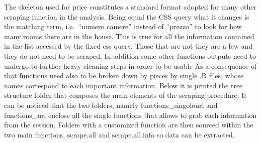 \documentclass[
  12pt,
  a4paper,
  oneside]{book}
\newenvironment{Shaded}{\begin{snugshade}}{\end{snugshade}}
\newcommand{\DataTypeTok}[1]{\textcolor[rgb]{0.13,0.29,0.53}{#1}}
\newcommand{\ErrorTok}[1]{\textcolor[rgb]{0.64,0.00,0.00}{\textbf{#1}}}
\newcommand{\KeywordTok}[1]{\textcolor[rgb]{0.13,0.29,0.53}{\textbf{#1}}}
\newcommand{\NormalTok}[1]{#1}
\newcommand{\StringTok}[1]{\textcolor[rgb]{0.31,0.60,0.02}{#1}}
\theoremstyle{definition}
\theoremstyle{definition}
\theoremstyle{definition}
\theoremstyle{remark}
\begin{document}
\begin{Shaded}
\begin{Highlighting}[]
{\NormalTok{                  ...}
                  
\NormalTok{                   combine =}\StringTok{ }\KeywordTok{tibble}\NormalTok{(}\DataTypeTok{ID        =}\NormalTok{ id,}
                                     \DataTypeTok{LAT       =}\NormalTok{ lat, }
                                     \DataTypeTok{LONG      =}\NormalTok{ long,}
                                     \DataTypeTok{LOCATION  =}\NormalTok{ location,}
                                     \DataTypeTok{CONDOM    =}\NormalTok{ condom,}
                                     \DataTypeTok{BUILDAGE  =}\NormalTok{ buildage,}
                                    
\NormalTok{                  ...}
                  
                  
                  \KeywordTok{return}\NormalTok{(combine)}
                  \ErrorTok{\}}
  \KeywordTok{stopImplicitCluster}\NormalTok{()                 }
  \KeywordTok{stopCluster}\NormalTok{(cl)}
  \KeywordTok{return}\NormalTok{(ALL)}
\ErrorTok{\}}
\end{Highlighting}
\end{Shaded}

The skeleton used for price constitutes a standard format adopted for many other scraping function in the analysis. Being equal the CSS query what it changes is the matching term, i.e.~``numero camere'' instead of ``prezzo'' to look for how many rooms there are in the house. This is true for all the information contained in the list accessed by the fixed css query. Those that are not they are a few and they do not need to be scraped.
In addition some other functions outputs need to undergo to further heavy cleaning steps in order to be usable As a consequence of that functions need also to be broken down by pieces by single .R files, whose names correspond to each important information.
Below it is printed the tree structure folder that composes the main elements of the scraping procedure. It can be noticed that the two folders, namely functions\_singolourl and functions\_url enclose all the single functions that allows to grab each information from the session. Folders with a customized function are then sourced within the two main functions, scrape.all and scrape.all.info so data can be extracted.
\end{document}
